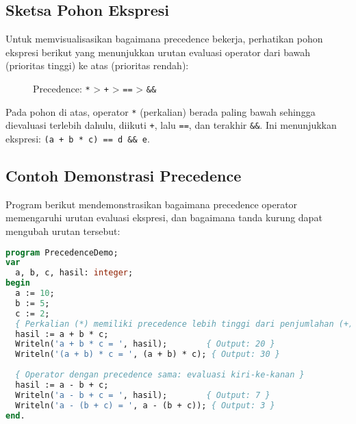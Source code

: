 \documentclass[../main.tex]{subfiles}
\begin{document}
\subsection{Sketsa Pohon Ekspresi}
Untuk memvisualisasikan bagaimana precedence bekerja, perhatikan pohon ekspresi berikut yang menunjukkan urutan evaluasi operator dari bawah (prioritas tinggi) ke atas (prioritas rendah):

\begin{figure}[H]
  \centering
  \caption{Precedence: \texttt{*} \textgreater{} \texttt{+} \textgreater{} \texttt{==} \textgreater{} \texttt{\&\&}}
\end{figure}

Pada pohon di atas, operator \texttt{*} (perkalian) berada paling bawah sehingga dievaluasi terlebih dahulu, diikuti \texttt{+}, lalu \texttt{==}, dan terakhir \texttt{\&\&}. Ini menunjukkan ekspresi: \texttt{(a + b * c) == d \&\& e}.

\subsection{Contoh Demonstrasi Precedence}

Program berikut mendemonstrasikan bagaimana precedence operator memengaruhi urutan evaluasi ekspresi, dan bagaimana tanda kurung dapat mengubah urutan tersebut:

\begin{lstlisting}[language=Pascal, caption={Precedence operator di Pascal}]
program PrecedenceDemo;
var
  a, b, c, hasil: integer;
begin
  a := 10;
  b := 5;
  c := 2;
  { Perkalian (*) memiliki precedence lebih tinggi dari penjumlahan (+) }
  hasil := a + b * c;
  Writeln('a + b * c = ', hasil);        { Output: 20 }
  Writeln('(a + b) * c = ', (a + b) * c); { Output: 30 }
  
  { Operator dengan precedence sama: evaluasi kiri-ke-kanan }
  hasil := a - b + c;
  Writeln('a - b + c = ', hasil);        { Output: 7 }
  Writeln('a - (b + c) = ', a - (b + c)); { Output: 3 }
end.
\end{lstlisting}
\end{document}
